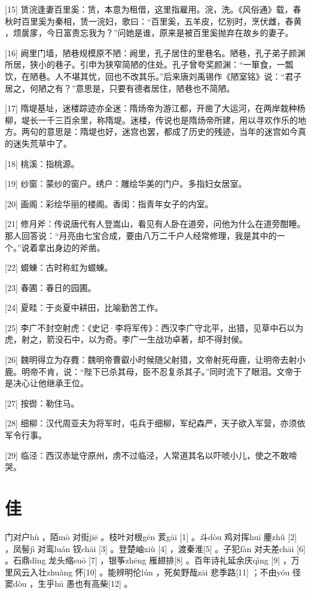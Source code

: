 \documentclass[12pt,UTF8]{ctexbook}
\begin{document}
[15] 赁浣逢妻百里奚：赁，本意为租借，这里指雇用。浣，洗。《风俗通》载，春秋时百里奚为秦相，赁一浣妇，歌曰：“百里奚，五羊皮，忆别时，烹伏雌，舂黄 ，烦扊扅，今日富贵忘我为？”问她是谁，原来是被百里奚抛弃在故乡的妻子。

[16] 阙里门墙，陋巷规模原不陋：阙里，孔子居住的里巷名。陋巷，孔子弟子颜渊所居，狭小的巷子。引申为狭窄简陋的住处。孔子曾夸奖颜渊：“一箪食，一瓢饮，在陋巷。人不堪其忧，回也不改其乐。”后来唐刘禹锡作《陋室铭》说：“君子居之，何陋之有？”意思是，只要有德者居住，陋巷也不简陋。

[17] 隋堤基址，迷楼踪迹亦全迷：隋炀帝为游江都，开凿了大运河，在两岸栽种杨柳，堤长一千三百余里，称隋堤。迷楼，传说也是隋炀帝所建，用以寻欢作乐的地方。两句的意思是：隋堤也好，迷宫也罢，都成了历史的残迹，当年的迷宫如今真的迷失荒草中了。

[18] 桃溪：指桃源。

[19] 纱窗：蒙纱的窗户。绣户：雕绘华美的门户。多指妇女居室。

[20] 画阁：彩绘华丽的楼阁。香闺：指青年女子的内室。

[21] 修月斧：传说唐代有人登嵩山，看见有人卧在道旁，问他为什么在道旁酣睡。那人回答说：“月亮由七宝合成，要由八万二千户人经常修理，我是其中的一个。”说着拿出身边的斧凿。

[22] 蝃蝀：古时称虹为蝃蝀。

[23] 春圃：春日的园圃。

[24] 夏畦：于炎夏中耕田，比喻勤苦工作。

[25] 李广不封空射虎：《史记·李将军传》：西汉李广守北平，出猎，见草中石以为虎，射之，箭没石中，以为奇。李广一生战功卓著，却不得封侯。

[26] 魏明得立为存麑：魏明帝曹叡小时候随父射猎，文帝射死母鹿，让明帝去射小鹿。明帝不肯，说：“陛下已杀其母，臣不忍复杀其子。”同时流下了眼泪。文帝于是决心让他继承王位。

[27] 按辔：勒住马。

[28] 细柳：汉代周亚夫为将军时，屯兵于细柳，军纪森严，天子欲入军营，亦须依军令行事。

[29] 临泾：西汉赤玼守原州，虏不过临泾，人常道其名以吓唬小儿，使之不敢啼哭。





\chapter{佳}


门对户hù ，陌mò 对街jiē 。枝叶对根gēn 荄gāi [1] 。斗dòu 鸡对挥huī 麈zhǔ [2] ，凤髻jì 对鸾luán 钗chāi [3] 。登楚岫xiù [4] ，渡秦淮[5] 。子犯fàn 对夫差chāi [6] 。石鼎dǐng 龙头缩suō [7] ，银筝zhēng 雁翅排[8] 。百年诗礼延余庆qìng [9] ，万里风云入壮zhuàng 怀[10] 。能辨明伦lún ，死矣野哉zāi 悲季路[11] ；不由yóu 径窦dòu ，生乎hū 愚也有高柴[12] 。
\end{document}
